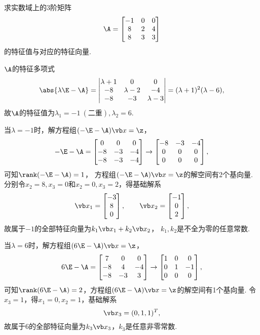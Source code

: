 \begin{example}
求实数域上的3阶矩阵\[
	\A = \begin{bmatrix}
		-1 & 0 & 0 \\
		8 & 2 & 4 \\
		8 & 3 & 3
	\end{bmatrix}
\]的特征值与对应的特征向量.
\begin{solution}
\(\A\)的特征多项式\[
	\abs{\lambda\E-\A}
	= \begin{vmatrix}
		\lambda+1 & 0 & 0 \\
		-8 & \lambda-2 & -4 \\
		-8 & -3 & \lambda-3
	\end{vmatrix}
	= (\lambda+1)^2 (\lambda-6),
\]
故\(\A\)的特征值为\(\lambda_1=-1\ (\text{二重}),
\lambda_2=6\).

当\(\lambda=-1\)时，解方程组\((-\E-\A)\x = \z\)，\[
	-\E-\A = \begin{bmatrix}
		0 & 0 & 0 \\
		-8 & -3 & -4 \\
		-8 & -3 & -4
	\end{bmatrix} \to \begin{bmatrix}
		-8 & -3 & -4 \\
		0 & 0 & 0 \\
		0 & 0 & 0
	\end{bmatrix},
\]
可知\(\rank(-\E-\A) = 1\)，
方程组\((-\E-\A)\x = \z\)的解空间有2个基向量.
分别令\(x_2 = 8, x_3 = 0\)和\(x_2 = 0, x_3 = 2\)，得基础解系\[
	\x_1 = \begin{bmatrix} -3 \\ 8 \\ 0 \end{bmatrix},
	\qquad
	\x_2 = \begin{bmatrix} -1 \\ 0 \\ 2 \end{bmatrix},
\]
故属于\(-1\)的全部特征向量为\(k_1 \x_1 + k_2 \x_2\)，
\(k_1,k_2\)是不全为零的任意常数.

当\(\lambda=6\)时，解方程组\((6\E-\A)\x = \z\)，\[
	6\E-\A = \begin{bmatrix}
		7 & 0 & 0 \\
		-8 & 4 & -4 \\
		-8 & -3 & 3
	\end{bmatrix} \to \begin{bmatrix}
		1 & 0 & 0 \\
		0 & 1 & -1 \\
		0 & 0 & 0
	\end{bmatrix},
\]
可知\(\rank(6\E-\A) = 2\)，方程组\((6\E-\A)\x = \z\)的解空间有1个基向量.
令\(x_3 = 1\)，得\(x_1 = 0, x_2 = 1\)，基础解系\[
	\x_3 = (0,1,1)^T,
\]
故属于\(6\)的全部特征向量为\(k_3 \x_3\)，\(k_3\)是任意非零常数.
\end{solution}
\end{example}

